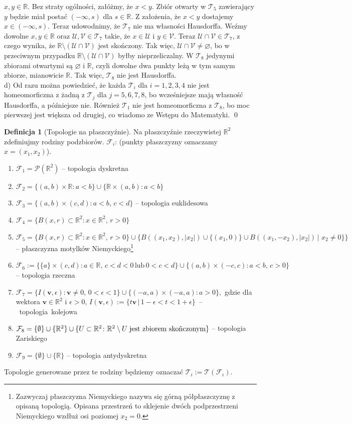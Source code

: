 \documentclass{article}
\theoremstyle{definition}%
\newtheorem{defn}{Definicja}
\theoremstyle{theorem}
\renewenvironment{proof}{{\bfseries Rozwiązanie}}{\qed}
\newcommand{\R}{\mathbb{R}} %
\newcommand{\Pow}{\mathcal{P}} %
\newcommand{\sT}{\mathcal{T}} %
\newcommand{\sF}{\mathcal{F}} %
\newcommand{\oU}{\mathcal{U}}
\newcommand{\oV}{\mathcal{V}}
\newcommand{\vv}{\mathbf{v}}
\begin{document}
\begin{proof}
	$x,y\in\R$. Bez straty ogólności, załóżmy, że $x<y$. Zbiór otwarty w $\sT_{5}$ zawierający $y$ będzie miał postać $(-\infty,s)$ dla $s\in\R$. Z założenia, że  $x<y$ dostajemy $x\in(-\infty,s)$. Teraz udowodnimy, że $\sT_{7}$ nie ma własności Hausdorffa. Weźmy dowolne $x,y\in\R$ oraz $\oU,\oV\in\sT_{7}$ takie, że $x\in\oU$ i $y\in\oV$. Teraz $\oU\cap\oV\in\sT_{7}$, z czego wynika, że $\R\setminus(\oU\cap\oV)$ jest skończony. Tak więc, 
	$\oU\cap\oV\not=\varnothing$, bo w przeciwnym przypadku $\R\setminus(\oU\cap\oV)$ byłby nieprzeliczalny. W $\sT_{8}$ jedynymi zbiorami otwartymi są $\varnothing$ i $\R$, czyli dowolne dwa punkty leżą w tym samym zbiorze, mianowicie $\R$. Tak więc, $\sT_{8}$ nie jest Hausdorffa.\\
	d) Od razu można powiedzieć, że każda $\mathcal{T}_{i}$ dla $i=1,2,3,4$ nie jest homeomorficzna z żadną z $\mathcal{T}_{j}$ dla $j=5,6,7,8$, bo wcześniejsze mają własność Hausdorffa, a późniejsze nie. Również $\mathcal{T}_{1}$ nie jest homeomorficzna z $\mathcal{T}_{8}$, bo moc pierwszej jest większa od drugiej, co wiadomo ze Wstępu do Matematyki.
	\end{proof}

 \begin{defn}[Topologie na płaszczyźnie]\label{plaszczyzna}Na płaszczyźnie rzeczywistej   $\R^2$ zdefiniujmy rodziny podzbiorów.  $\sF_i$: (punkty płaszczyzny oznaczamy $x=(x_1,x_2)$).
\begin{enumerate}
\item $\sF_1=\Pow (\R^2)$ -- topologia dyskretna
\item $\sF_2=\{(a,b)\times\R \colon a<b\}\cup\{\R\times(a,b) \colon a<b\}$
\item $\sF_3=\{(a,b)\times (c,d) \colon  a<b,\, c<d\}$ -- topologia euklidesowa
\item $\sF_4=\{B(x,r)\subset \R^2\colon  x\in\R^2,\,  r>0 \}$
\item $\sF_5=\{B(x,r)\subset \R^2\colon  x\in\R^2,\,  r>0 \}\cup \{B((x_1,x_2),|x_2|)\cup \{(x_1,0)\}\cup B((x_1,- x_2),|x_2|)\, |\,  \, x_2\neq 0\}\}$ -- płaszczyzna motylków Niemyckiego\footnote{Zazwyczaj płaszczyzna Niemyckiego nazywa się górną półpłaszczyznę z opisaną topologią. Opisana przestrzeń to sklejenie dwóch  podprzestrzeni Niemyckiego wzdłuż osi poziomej $x_2=0$.}

\item $\sF_6:=\{\{a\}\times (c,d) \colon a\in\R,\, c<d<0\, \text{lub}\, 0<c<d\}\cup\{ (a,b)\times (-c,c)  \colon a < b,\, c >0\}$ -- topologia rzeczna
\item $\sF_7=\{I(\vv,\epsilon)  \colon \vv\neq 0,\, 0<\epsilon<1 \}\cup  \{(-a,a)\times (-a,a) \colon a >0\},$ gdzie  dla wektora $\vv\in\R^2$ i $\epsilon >0$,   \hbox{$I(\vv,\epsilon) := \{t\vv\,|\, 1-\epsilon < t < 1+\epsilon\}$ -- topologia kolejowa}
\item $\sF_8=\{\emptyset\}\cup\{\R^2\}\cup\{U\subset \R^2\colon  \R^2\setminus U \; \hbox{jest zbiorem skoñczonym}\}$ -- topologia Zariskiego
\item $\sF_{9}=\{\emptyset\}\cup\{\R\}$ -- topologia antydyskretna
\end{enumerate}
Topologie generowane przez te rodziny będziemy oznaczać $\sT_i := \sT (\sF_i)$.
\end{defn}
\end{document}
